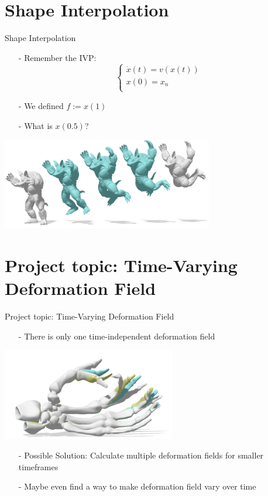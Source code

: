 \documentclass[xcolor=dvipsnames]{beamer}
\begin{document}
\section{Shape Interpolation}
\begin{frame}{Shape Interpolation}
\begin{enumerate}
\item[-] Remember the IVP: \begin{equation*}
  	\begin{cases}
    \dot{x}(t) = v(x(t)) \\
    x(0) = x_n \\
    \end{cases}
    \end{equation*}
\item[-] We defined $f:=x(1)$
\item[-] What is $x(0.5)$?
\end{enumerate}
\begin{center}
\includegraphics[height=4cm]{Pictures/Interpolation.png}
\end{center}
\end{frame}

\section{Project topic: Time-Varying Deformation Field}
\begin{frame}{Project topic: Time-Varying Deformation Field}
\begin{enumerate}
\item[-] There is only one time-independent deformation field
\end{enumerate}
\begin{center}
\includegraphics[height=4cm]{Pictures/hand.png}
\end{center}
\begin{enumerate}
\item[-] Possible Solution: Calculate multiple deformation fields for smaller timeframes
\item[-] Maybe even find a way to make deformation field vary over time
\end{enumerate}
\end{frame}

\end{document}
